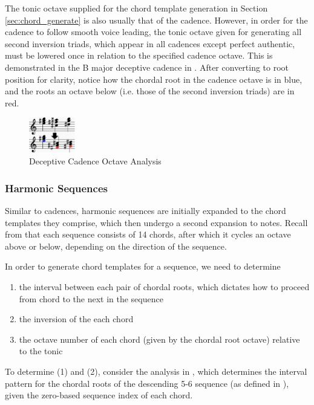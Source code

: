 \documentclass{article}
\begin{document}
The tonic octave supplied for the chord template generation in Section \ref{sec:chord_generate} is also usually that of the cadence. However, in order for the cadence to follow smooth voice leading, the tonic octave given for generating all second inversion triads, which appear in all cadences except perfect authentic, must be lowered once in relation to the specified cadence octave. This is demonstrated in the B major deceptive cadence in . After converting to root position for clarity, notice how the chordal root in the cadence octave is in blue, and the roots an octave below (i.e. those of the second inversion triads) are in red.

\begin{figure}[h!]
\centering
\includegraphics[width=0.18\textwidth]{images/cadence_octaves}
  \caption{Deceptive Cadence Octave Analysis}\label{fig:cadence_octaves}
\end{figure}

\subsubsection{Harmonic Sequences}
Similar to cadences, harmonic sequences are initially expanded to the chord templates they comprise, which then undergo a second expansion to notes. Recall from  that each sequence consists of 14 chords, after which it cycles an octave above or below, depending on the direction of the sequence.

In order to generate chord templates for a sequence, we need to determine 
\vspace{-2mm}
\begin{enumerate}
\itemsep0em 
\item the interval between each pair of chordal roots, which dictates how to proceed from chord to the next in the sequence
\item the inversion of the each chord
\item the octave number of each chord (given by the chordal root octave) relative to the tonic
\end{enumerate}

To determine (1) and (2), consider the analysis in , which determines the interval pattern for the chordal roots of the descending 5-6 sequence (as defined in ), given the zero-based sequence index of each chord. 
\end{document}
